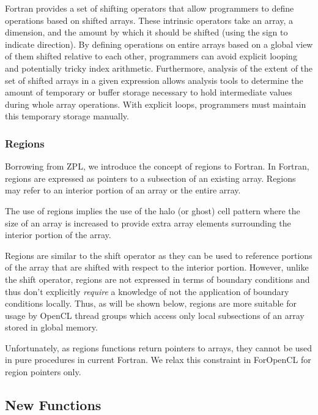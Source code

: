 Fortran provides a set of shifting operators that allow programmers to
define operations based on shifted arrays.  These intrinsic operators take
an array, a dimension, and the amount by which it should be shifted (using
the sign to indicate direction).  By defining operations on entire arrays
based on a global view of them shifted relative to each other, programmers can
avoid explicit looping and potentially tricky index arithmetic.  Furthermore,
analysis of the extent of the set of shifted arrays in a given expression
allows analysis tools to determine the amount of temporary or buffer storage
necessary to hold intermediate values during whole array operations.  With
explicit loops, programmers must maintain this temporary storage manually.

\subsubsection*{Regions}

Borrowing from ZPL, we introduce the concept of regions to Fortran.  In
Fortran, regions are expressed as pointers to a subsection of an existing array.
Regions may refer to an interior portion of an array or the entire array.

The use of regions implies the use of the halo (or ghost) cell pattern 
where the size of an array is increased to provide extra array elements
surrounding the interior portion of the array.  

Regions are similar to the shift operator as they can be used to reference
portions of the array that are shifted with respect to the interior portion.
However, unlike the shift operator, regions are not expressed in terms of
boundary conditions and thus don't explicitly \emph{require} a knowledge of
not the application of boundary conditions locally.  Thus, as will be shown
below, regions are more suitable for usage by OpenCL thread groups which
access only local subsections of an array stored in global memory.

Unfortunately, as regions functions return pointers to arrays, they cannot
be used in pure procedures in current Fortran.  We relax this constraint in
ForOpenCL for region pointers only.

\subsection{New Functions}

%


